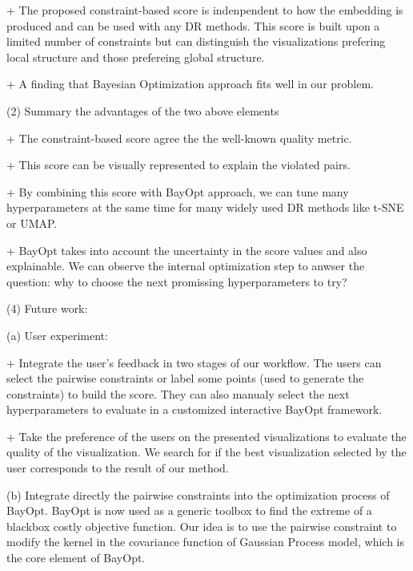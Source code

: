 + The proposed constraint-based score is indenpendent to how the embedding is produced and can be used with any DR methods.
This score is built upon a limited number of constraints but can distinguish the visualizations prefering local structure and those prefereing global structure.

+ A finding that Bayesian Optimization approach fits well in our problem.


\vspace{8pt}
\par (2) Summary the advantages of the two above elements

+ The constraint-based score agree the the well-known quality metric.

+ This score can be visually represented to explain the violated pairs.

+ By combining this score with BayOpt approach, we can tune many hyperparameters at the same time for many widely used DR methods like t-SNE or UMAP.

+ BayOpt takes into account the uncertainty in the score values and also explainable. We can observe the internal optimization step to anwser the question: why to choose the next promissing hyperparameters to try?


\vspace{8pt}
\par (4) Future work:

(a) User experiment:

+ Integrate the user's feedback in two stages of our workflow.
The users can select the pairwise constraints or label some points (used to generate the constraints) to build the score.
They can also manualy select the next hyperparameters to evaluate in a customized interactive BayOpt framework.

+ Take the preference of the users on the presented visualizations to evaluate the quality of the visualization. We search for if the best visualization selected by the user corresponds to the result of our method.


(b) Integrate directly the pairwise constraints into the optimization process of BayOpt.
BayOpt is now used as a generic toolbox to find the extreme of a blackbox costly objective function.
Our idea is to use the pairwise constraint to modify the kernel in the covariance function of Gaussian Process model, which is the core element of BayOpt.
